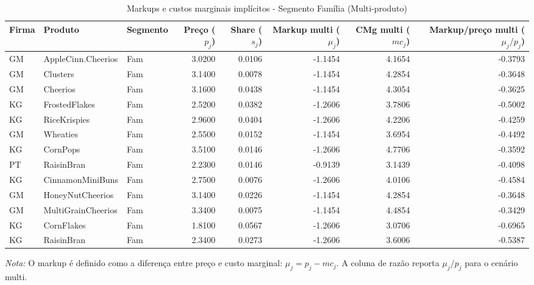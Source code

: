 \begingroup
\begin{table}[H]
\centering
\caption{Markups e custos marginais implícitos - Segmento Família (Multi-produto)}
\label{tab:markups-fam-multi}
\scriptsize
\setlength{\tabcolsep}{3pt}
\renewcommand{\arraystretch}{1.05}
\begin{tabular}{@{}llp{}rrrrr@{}}
\toprule
Firma & Produto & Segmento & Preço ($p_j$) & Share ($s_j$) & Markup multi ($\mu_j$) & CMg multi ($mc_j$) & Markup/preço multi ($\mu_j/p_j$) \\
\midrule
GM & AppleCinn.Cheerios & Fam & 3.0200 & 0.0106 & -1.1454 & 4.1654 & -0.3793 \\
GM & Clusters & Fam & 3.1400 & 0.0078 & -1.1454 & 4.2854 & -0.3648 \\
GM & Cheerios & Fam & 3.1600 & 0.0438 & -1.1454 & 4.3054 & -0.3625 \\
KG & FrostedFlakes & Fam & 2.5200 & 0.0382 & -1.2606 & 3.7806 & -0.5002 \\
KG & RiceKrispies & Fam & 2.9600 & 0.0404 & -1.2606 & 4.2206 & -0.4259 \\
GM & Wheaties & Fam & 2.5500 & 0.0152 & -1.1454 & 3.6954 & -0.4492 \\
KG & CornPops & Fam & 3.5100 & 0.0146 & -1.2606 & 4.7706 & -0.3592 \\
PT & RaisinBran & Fam & 2.2300 & 0.0146 & -0.9139 & 3.1439 & -0.4098 \\
KG & CinnamonMiniBuns & Fam & 2.7500 & 0.0076 & -1.2606 & 4.0106 & -0.4584 \\
GM & HoneyNutCheerios & Fam & 3.1400 & 0.0226 & -1.1454 & 4.2854 & -0.3648 \\
GM & MultiGrainCheerios & Fam & 3.3400 & 0.0075 & -1.1454 & 4.4854 & -0.3429 \\
KG & CornFlakes & Fam & 1.8100 & 0.0567 & -1.2606 & 3.0706 & -0.6965 \\
KG & RaisinBran & Fam & 2.3400 & 0.0273 & -1.2606 & 3.6006 & -0.5387 \\
\bottomrule
\end{tabular}

\vspace{0.3em}
\scriptsize
\textit{Nota:} O markup é definido como a diferença entre preço e custo marginal: $\mu_j=p_j-mc_j$. A coluna de razão reporta $\mu_j/p_j$ para o cenário multi.
\end{table}
\endgroup


